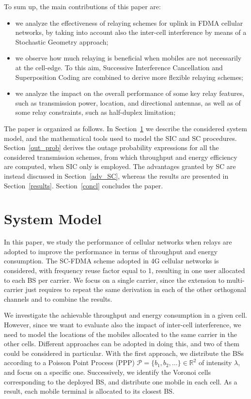 \documentclass[12pt, letterpaper, onecolumn, draftcls]{IEEEtran}
\begin{document}
To sum up, the main contributions of this paper are:
\begin{itemize}
 \item we analyze the effectiveness of relaying schemes for uplink in FDMA cellular networks, by taking into account also the inter-cell interference by means of a Stochastic Geometry approach;
 \item we observe how much relaying is beneficial when mobiles are not necessarily at the cell-edge. To this aim, Successive Interference Cancellation and Superposition Coding are combined to derive more flexible relaying schemes;
 \item we analyze the impact on the overall performance of some key relay features, such as transmission power, location, and directional antennas, as well as of some relay constraints, such as half-duplex limitation;
\end{itemize}



The paper is organized as follows. In Section~\ref{sys_mod} we describe the considered system model, and the mathematical tools used to model the SIC and SC procedures. Section~\ref{out_prob} derives the outage probability expressions for all the considered transmission schemes, from which throughput and energy efficiency are computed, when SIC only is employed. The advantages granted by SC are instead discussed in Section~\ref{adv_SC}, whereas the results are presented in Section~\ref{results}. Section~\ref{concl} concludes the paper.

\section{System Model}
\label{sys_mod}
In this paper, we study the performance of cellular networks when relays are adopted to improve the performance in terms of throughput and energy consumption.
The SC-FDMA scheme adopted in 4G cellular networks is considered, with frequency reuse factor equal to 1, resulting in one user allocated to each BS per carrier.
We focus on a single carrier, since the extension to multi-carrier just requires to repeat the same derivation in each of the other orthogonal channels and to combine the results.

We investigate the achievable throughput and energy consumption in a given cell. However, since we want to evaluate also the impact of inter-cell interference, we need to model the locations of the mobiles allocated to the same carrier in the other cells.
Different approaches can be adopted in doing this, and two of them could be considered in particular.
With the first approach, we distribute the BSs according to a Poisson Point Process (PPP) $\mathcal{P}=\{b_1,b_2,\ldots\}\in\mathbb{R}^2$ of intensity $\lambda$, and focus on a specific one. Successively, we identify the Voronoi cells corresponding to the deployed BS, and distribute one mobile in each cell. As a result, each mobile terminal is allocated to its closest BS.
\end{document}
